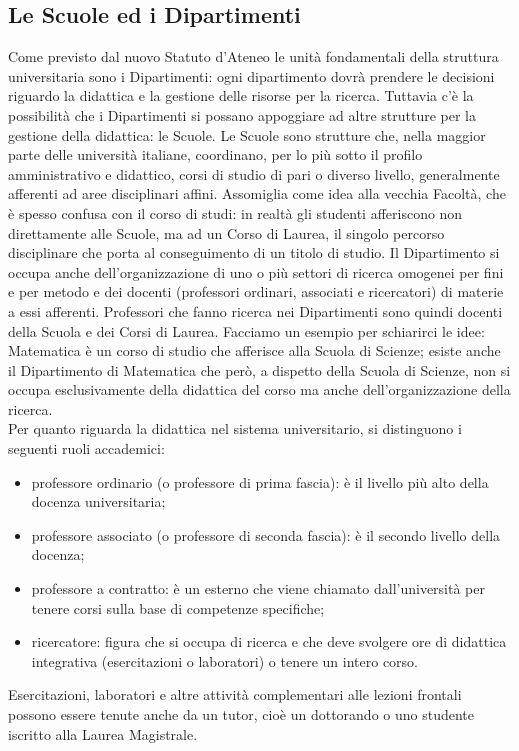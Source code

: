 
\subsection{Le Scuole ed i Dipartimenti}

Come previsto dal nuovo Statuto d'Ateneo le unità fondamentali della struttura universitaria sono i Dipartimenti: ogni dipartimento dovrà prendere le decisioni riguardo la didattica e la gestione delle risorse per la ricerca. Tuttavia c'è la possibilità che i Dipartimenti si possano appoggiare ad altre strutture per la gestione della didattica: le Scuole. Le Scuole sono strutture che, nella maggior parte delle università italiane, coordinano, per lo più sotto il profilo amministrativo e didattico, corsi di studio di pari o diverso livello, generalmente afferenti ad aree disciplinari affini. Assomiglia come idea alla vecchia Facoltà, che è spesso confusa con il corso di studi: in realtà gli studenti afferiscono non direttamente alle Scuole, ma ad un Corso di Laurea, il singolo percorso disciplinare che porta al conseguimento di un titolo di studio.
Il Dipartimento si occupa anche dell'organizzazione di uno o più settori di ricerca omogenei per fini e per metodo e dei docenti (professori ordinari, associati e ricercatori) di materie a essi afferenti. Professori che fanno ricerca nei Dipartimenti sono quindi docenti della Scuola e dei Corsi di Laurea.
Facciamo un esempio per schiarirci le idee: Matematica è un corso di studio che afferisce alla Scuola di Scienze; esiste anche il Dipartimento di Matematica che però, a dispetto della Scuola di Scienze, non si occupa esclusivamente della didattica del corso ma anche dell’organizzazione della ricerca.\\
Per quanto riguarda la didattica nel sistema universitario, si distinguono i seguenti ruoli accademici:
\begin{itemize}
\item professore ordinario (o professore di prima fascia): è il livello più alto della docenza universitaria;
\item professore associato (o professore di seconda fascia): è il secondo livello della docenza;
\item professore a contratto: è un esterno che viene chiamato dall’università per tenere corsi sulla base di competenze specifiche;
\item ricercatore: figura che si occupa di ricerca e che deve svolgere ore di didattica integrativa (esercitazioni o laboratori) o tenere un intero corso.
\end{itemize}
Esercitazioni, laboratori e altre attività complementari alle lezioni frontali possono essere tenute anche da un tutor, cioè un dottorando o uno studente iscritto alla Laurea Magistrale.

